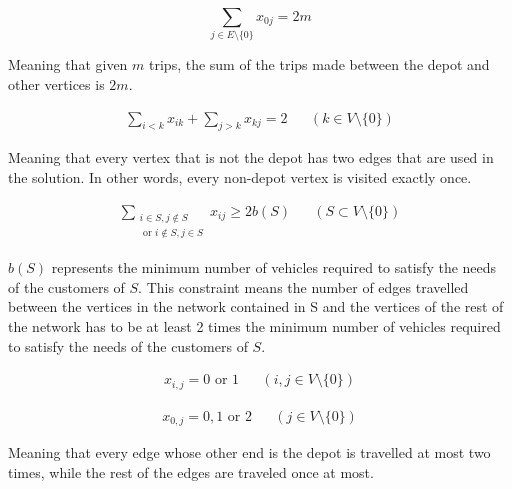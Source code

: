 \begin{equation}
\label{eq:baseformula2}
\displaystyle \sum_{j \in E \setminus\{0\}} x_{0j} = 2m
\end{equation}

\noindent
Meaning that given $m$ trips, the sum of the trips made between the depot and other vertices is $2m$.


\begin{equation}
\begin{aligned}
\label{eq:baseformula3}
\displaystyle\sum_{i < k} x_{ik} + \displaystyle\sum_{j > k} x_{kj} = 2 && (k \in V \setminus\{0\})
\end{aligned}
\end{equation}

\noindent
Meaning that every vertex that is not the depot has two edges that are used in the solution. In other words, every non-depot vertex is visited exactly once.


\begin{equation}
\begin{aligned}
\label{eq:baseformula4}
\displaystyle\sum_{\substack{i \in S, j \notin S \\ 
\text{ or } i \notin S, j \in S}} x_{ij} \geq 2b(S) && (S \subset V \setminus\{0\})
\end{aligned}
\end{equation}

\noindent
$b(S)$ represents the minimum number of vehicles required to satisfy the needs of the customers of $S$. This constraint means the number of edges travelled between the vertices in the network contained in S and the vertices of the rest of the network has to be at least 2 times the minimum number of vehicles required to satisfy the needs of the customers of $S$. 



\begin{equation}
\begin{aligned}
\label{eq:baseformula5}
x_{i,j} = 0 \text{ or } 1 && (i, j \in V\setminus\{0\})
\end{aligned}
\end{equation}


\begin{equation}
\begin{aligned}
\label{eq:baseformula6}
x_{0,j} = 0, 1 \text{ or } 2 && (j \in V\setminus\{0\})
\end{aligned}
\end{equation}

\noindent
Meaning that every edge whose other end is the depot is travelled at most two times, while the rest of the edges are traveled once at most. \cite{laporte2007you}




